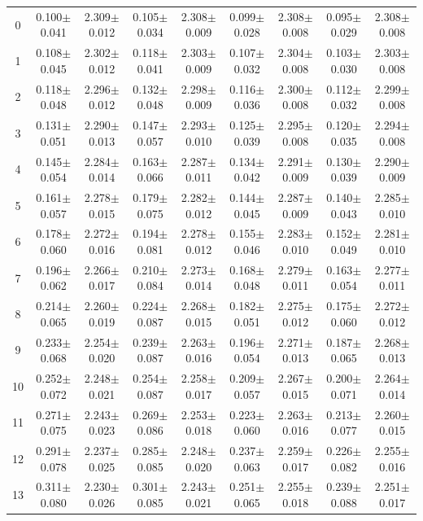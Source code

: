 \begin{table}[H]
{\begin{tabular}{c cc cc cc cc}
0 & 0.100$\pm$0.041 & 2.309$\pm$0.012 & 0.105$\pm$0.034 & 2.308$\pm$0.009 & 0.099$\pm$0.028 & 2.308$\pm$0.008 & 0.095$\pm$0.029 & 2.308$\pm$0.008 \\
1 & 0.108$\pm$0.045 & 2.302$\pm$0.012 & 0.118$\pm$0.041 & 2.303$\pm$0.009 & 0.107$\pm$0.032 & 2.304$\pm$0.008 & 0.103$\pm$0.030 & 2.303$\pm$0.008 \\
2 & 0.118$\pm$0.048 & 2.296$\pm$0.012 & 0.132$\pm$0.048 & 2.298$\pm$0.009 & 0.116$\pm$0.036 & 2.300$\pm$0.008 & 0.112$\pm$0.032 & 2.299$\pm$0.008 \\
3 & 0.131$\pm$0.051 & 2.290$\pm$0.013 & 0.147$\pm$0.057 & 2.293$\pm$0.010 & 0.125$\pm$0.039 & 2.295$\pm$0.008 & 0.120$\pm$0.035 & 2.294$\pm$0.008 \\
4 & 0.145$\pm$0.054 & 2.284$\pm$0.014 & 0.163$\pm$0.066 & 2.287$\pm$0.011 & 0.134$\pm$0.042 & 2.291$\pm$0.009 & 0.130$\pm$0.039 & 2.290$\pm$0.009 \\
5 & 0.161$\pm$0.057 & 2.278$\pm$0.015 & 0.179$\pm$0.075 & 2.282$\pm$0.012 & 0.144$\pm$0.045 & 2.287$\pm$0.009 & 0.140$\pm$0.043 & 2.285$\pm$0.010 \\
6 & 0.178$\pm$0.060 & 2.272$\pm$0.016 & 0.194$\pm$0.081 & 2.278$\pm$0.012 & 0.155$\pm$0.046 & 2.283$\pm$0.010 & 0.152$\pm$0.049 & 2.281$\pm$0.010 \\
7 & 0.196$\pm$0.062 & 2.266$\pm$0.017 & 0.210$\pm$0.084 & 2.273$\pm$0.014 & 0.168$\pm$0.048 & 2.279$\pm$0.011 & 0.163$\pm$0.054 & 2.277$\pm$0.011 \\
8 & 0.214$\pm$0.065 & 2.260$\pm$0.019 & 0.224$\pm$0.087 & 2.268$\pm$0.015 & 0.182$\pm$0.051 & 2.275$\pm$0.012 & 0.175$\pm$0.060 & 2.272$\pm$0.012 \\
9 & 0.233$\pm$0.068 & 2.254$\pm$0.020 & 0.239$\pm$0.087 & 2.263$\pm$0.016 & 0.196$\pm$0.054 & 2.271$\pm$0.013 & 0.187$\pm$0.065 & 2.268$\pm$0.013 \\
10 & 0.252$\pm$0.072 & 2.248$\pm$0.021 & 0.254$\pm$0.087 & 2.258$\pm$0.017 & 0.209$\pm$0.057 & 2.267$\pm$0.015 & 0.200$\pm$0.071 & 2.264$\pm$0.014 \\
11 & 0.271$\pm$0.075 & 2.243$\pm$0.023 & 0.269$\pm$0.086 & 2.253$\pm$0.018 & 0.223$\pm$0.060 & 2.263$\pm$0.016 & 0.213$\pm$0.077 & 2.260$\pm$0.015 \\
12 & 0.291$\pm$0.078 & 2.237$\pm$0.025 & 0.285$\pm$0.085 & 2.248$\pm$0.020 & 0.237$\pm$0.063 & 2.259$\pm$0.017 & 0.226$\pm$0.082 & 2.255$\pm$0.016 \\
13 & 0.311$\pm$0.080 & 2.230$\pm$0.026 & 0.301$\pm$0.085 & 2.243$\pm$0.021 & 0.251$\pm$0.065 & 2.255$\pm$0.018 & 0.239$\pm$0.088 & 2.251$\pm$0.017 \\

\end{tabular}}
\end{table}
